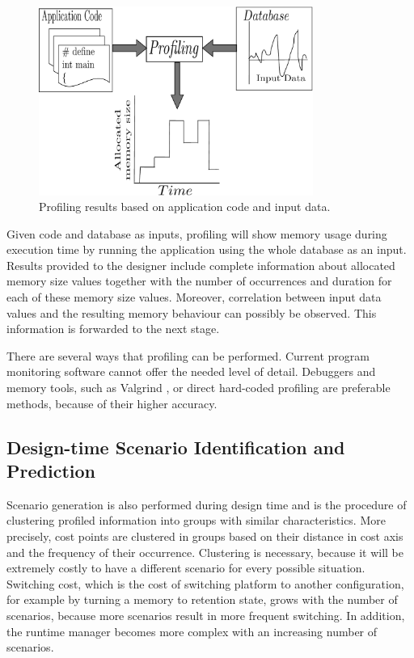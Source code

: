 \begin{figure}[!t]
\centering
\includegraphics[width=0.8\textwidth]{A/profiling_v2-eps-converted-to.pdf}
\caption{Profiling results based on application code and input data.}
\label{fig:profilingA}
\end{figure}

Given code and database as inputs, profiling will show memory usage during execution time by running the application using the whole database as an input. Results provided to the designer include complete information about allocated memory size values together with the number of occurrences and duration for each of these memory size values. Moreover, correlation between input data values and the resulting memory behaviour can possibly be observed. This information is forwarded to the next stage.

There are several ways that profiling can be performed. Current program monitoring software cannot offer the needed level of detail. Debuggers and memory tools, such as Valgrind \cite{Valgrind}, or direct hard-coded profiling are preferable methods, because of their higher accuracy.

\subsection{Design-time Scenario Identification and Prediction}

Scenario generation is also performed during design time and is the procedure of clustering profiled information into groups with similar characteristics. More precisely, cost points are clustered in groups based on their distance in cost axis and the frequency of their occurrence. Clustering is necessary, because it will be extremely costly to have a different scenario for every possible situation. Switching cost, which is the cost of switching platform to another configuration, for example by turning a memory to retention state, grows with the number of scenarios, because more scenarios result in more frequent switching. In addition, the runtime manager becomes more complex with an increasing number of scenarios.

